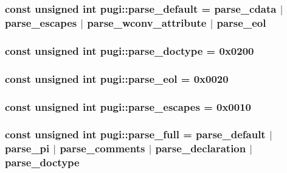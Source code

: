 \hypertarget{namespacepugi_ad7c927d1c1752330637c3318b0d7b366}{
\subsubsection[{parse\-\_\-default}]{\setlength{\rightskip}{0pt plus 5cm}const unsigned int pugi\-::parse\-\_\-default = {\bf parse\-\_\-cdata} $|$ {\bf parse\-\_\-escapes} $|$ {\bf parse\-\_\-wconv\-\_\-attribute} $|$ {\bf parse\-\_\-eol}}}\label{namespacepugi_ad7c927d1c1752330637c3318b0d7b366}
\hypertarget{namespacepugi_afa993ffcd3e228d21f48071e7c097f32}{
\subsubsection[{parse\-\_\-doctype}]{\setlength{\rightskip}{0pt plus 5cm}const unsigned int pugi\-::parse\-\_\-doctype = 0x0200}}\label{namespacepugi_afa993ffcd3e228d21f48071e7c097f32}
\hypertarget{namespacepugi_ad4e017365d2ff3ee04e226c35129b475}{
\subsubsection[{parse\-\_\-eol}]{\setlength{\rightskip}{0pt plus 5cm}const unsigned int pugi\-::parse\-\_\-eol = 0x0020}}\label{namespacepugi_ad4e017365d2ff3ee04e226c35129b475}
\hypertarget{namespacepugi_ab5ef8454110599611900ff48012c8ad6}{
\subsubsection[{parse\-\_\-escapes}]{\setlength{\rightskip}{0pt plus 5cm}const unsigned int pugi\-::parse\-\_\-escapes = 0x0010}}\label{namespacepugi_ab5ef8454110599611900ff48012c8ad6}
\hypertarget{namespacepugi_a7d773377222d4cb6951297d61605c6a7}{
\subsubsection[{parse\-\_\-full}]{\setlength{\rightskip}{0pt plus 5cm}const unsigned int pugi\-::parse\-\_\-full = {\bf parse\-\_\-default} $|$ {\bf parse\-\_\-pi} $|$ {\bf parse\-\_\-comments} $|$ {\bf parse\-\_\-declaration} $|$ {\bf parse\-\_\-doctype}}}\label{namespacepugi_a7d773377222d4cb6951297d61605c6a7}
